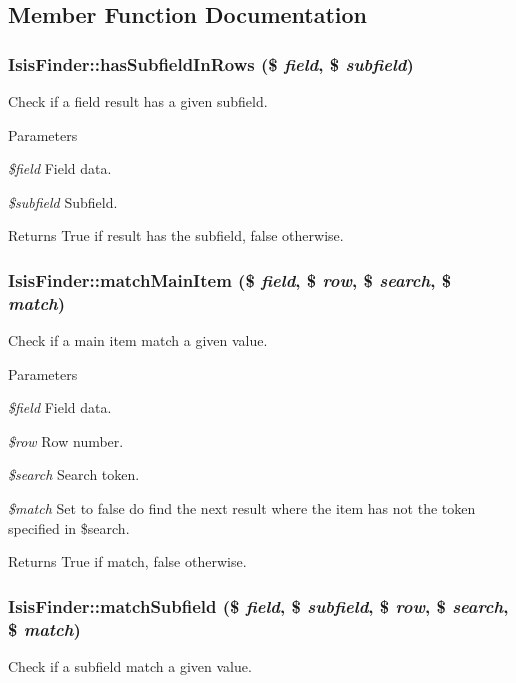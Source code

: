 \subsection{Member Function Documentation}
\hypertarget{classIsisFinder_a41410b18c4462c05ac669e4ee889d8a7}{
\subsubsection[{hasSubfieldInRows}]{\setlength{\rightskip}{0pt plus 5cm}IsisFinder::hasSubfieldInRows (\$ {\em field}, \/  \$ {\em subfield})}}
\label{classIsisFinder_a41410b18c4462c05ac669e4ee889d8a7}
Check if a field result has a given subfield.


\begin{DoxyParams}{Parameters}
\item[{\em \$field}]Field data.\item[{\em \$subfield}]Subfield.\end{DoxyParams}
\begin{DoxyReturn}{Returns}
True if result has the subfield, false otherwise. 
\end{DoxyReturn}
\hypertarget{classIsisFinder_ab35a9bb21e83df846b6ff57bcbe117ae}{
\subsubsection[{matchMainItem}]{\setlength{\rightskip}{0pt plus 5cm}IsisFinder::matchMainItem (\$ {\em field}, \/  \$ {\em row}, \/  \$ {\em search}, \/  \$ {\em match})}}
\label{classIsisFinder_ab35a9bb21e83df846b6ff57bcbe117ae}
Check if a main item match a given value.


\begin{DoxyParams}{Parameters}
\item[{\em \$field}]Field data.\item[{\em \$row}]Row number.\item[{\em \$search}]Search token.\item[{\em \$match}]Set to false do find the next result where the item has not the token specified in \$search.\end{DoxyParams}
\begin{DoxyReturn}{Returns}
True if match, false otherwise. 
\end{DoxyReturn}
\hypertarget{classIsisFinder_a20539e44cfc30ca3897e174781c4b26c}{
\subsubsection[{matchSubfield}]{\setlength{\rightskip}{0pt plus 5cm}IsisFinder::matchSubfield (\$ {\em field}, \/  \$ {\em subfield}, \/  \$ {\em row}, \/  \$ {\em search}, \/  \$ {\em match})}}
\label{classIsisFinder_a20539e44cfc30ca3897e174781c4b26c}
Check if a subfield match a given value.


